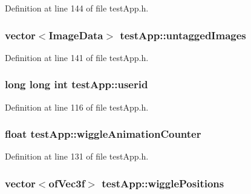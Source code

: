Definition at line 144 of file test\-App.\-h.

\hypertarget{classtest_app_a9cb9aa0700c4c8b316329a86c4e650ec}{
\subsubsection[{untagged\-Images}]{\setlength{\rightskip}{0pt plus 5cm}vector$<${\bf Image\-Data}$>$ test\-App\-::untagged\-Images}}\label{classtest_app_a9cb9aa0700c4c8b316329a86c4e650ec}


Definition at line 141 of file test\-App.\-h.

\hypertarget{classtest_app_a6ae76dc97fbeee00755f4a6cd6b87e19}{
\subsubsection[{userid}]{\setlength{\rightskip}{0pt plus 5cm}long long int test\-App\-::userid}}\label{classtest_app_a6ae76dc97fbeee00755f4a6cd6b87e19}


Definition at line 116 of file test\-App.\-h.

\hypertarget{classtest_app_a6073b33be7847d675ec089a1d514c506}{
\subsubsection[{wiggle\-Animation\-Counter}]{\setlength{\rightskip}{0pt plus 5cm}float test\-App\-::wiggle\-Animation\-Counter}}\label{classtest_app_a6073b33be7847d675ec089a1d514c506}


Definition at line 131 of file test\-App.\-h.

\hypertarget{classtest_app_a5495d37f44bb3e3b00a04ad5910e0a6b}{
\subsubsection[{wiggle\-Positions}]{\setlength{\rightskip}{0pt plus 5cm}vector$<$of\-Vec3f$>$ test\-App\-::wiggle\-Positions}}\label{classtest_app_a5495d37f44bb3e3b00a04ad5910e0a6b}


